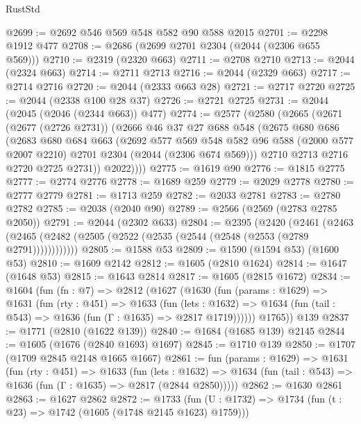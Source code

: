 \begin{lexlean}{RustStd}
\begin{coremodule}
@2699 := @2692 @546 @569 @548 @582 @90 @588 @2015
@2701 := @2298 @1912 @477
@2708 := @2686 (@2699 @2701 @2304 (@2044 (@2306 @655 @569)))
@2710 := @2319 (@2320 @663)
@2711 := @2708 @2710
@2713 := @2044 (@2324 @663)
@2714 := @2711 @2713
@2716 := @2044 (@2329 @663)
@2717 := @2714 @2716
@2720 := @2044 (@2333 @663 @28)
@2721 := @2717 @2720
@2725 := @2044 (@2338 @100 @28 @37)
@2726 := @2721 @2725
@2731 := @2044 (@2045 (@2046 (@2344 @663)) @477)
@2774 := @2577
    (@2580
      (@2665
        (@2671
          (@2677 (@2726 @2731))
          (@2666
            @46
            @37
            @27
            @688
            @548
            (@2675
              @680
              @686
              (@2683
                @680
                @684
                @663
                (@2692
                  @577
                  @569
                  @548
                  @582
                  @96
                  @588
                  (@2000 @577 @2007 @2210)
                  @2701
                  @2304
                  (@2044 (@2306 @674 @569)))
                @2710
                @2713
                @2716
                @2720
                @2725
                @2731))
            @2022))))
@2775 := @1619 @90
@2776 := @1815 @2775
@2777 := @2774 @2776
@2778 := @1689 @259
@2779 := @2029 @2778
@2780 := @2777 @2779
@2781 := @1713 @259
@2782 := @2033 @2781
@2783 := @2780 @2782
@2785 := @2038 (@2040 @90)
@2789 := @2566 (@2569 (@2783 @2785 @2050))
@2791 := @2044 (@2302 @633)
@2804 := @2395
    (@2420
      (@2461 (@2463 (@2465 (@2482 (@2505 (@2522 (@2535 (@2544 (@2548 (@2553 (@2789 @2791))))))))))))
@2805 := @1588 @53
@2809 := @1590 (@1594 @53) (@1600 @53)
@2810 := @1609 @2142
@2812 := @1605 (@2810 @1624)
@2814 := @1647 (@1648 @53)
@2815 := @1643 @2814
@2817 := @1605 (@2815 @1672)
@2834 := @1604
    (fun (fn : @7) =>
    @2812
      (@1627
        (@1630
          (fun (params : @1629) =>
          @1631
            (fun (rty : @451) =>
            @1633
              (fun (lets : @1632) =>
              @1634 (fun (tail : @543) => @1636 (fun (Γ : @1635) => @2817 @1719))))))
        @1765))
    @139
@2837 := @1771 (@2810 (@1622 @139))
@2840 := @1684 (@1685 @139) @2145
@2844 := @1605 (@1676 (@2840 @1693) @1697)
@2845 := @1710 @139
@2850 := @1707 (@1709 @2845 @2148 @1665 @1667)
@2861 := fun (params : @1629) =>
  @1631
    (fun (rty : @451) =>
    @1633
      (fun (lets : @1632) =>
      @1634 (fun (tail : @543) => @1636 (fun (Γ : @1635) => @2817 (@2844 @2850)))))
@2862 := @1630 @2861
@2863 := @1627 @2862
@2872 := @1733 (fun (U : @1732) => @1734 (fun (t : @23) => @1742 (@1605 (@1748 @2145 @1623) @1759)))

\end{coremodule}
\end{lexlean}
